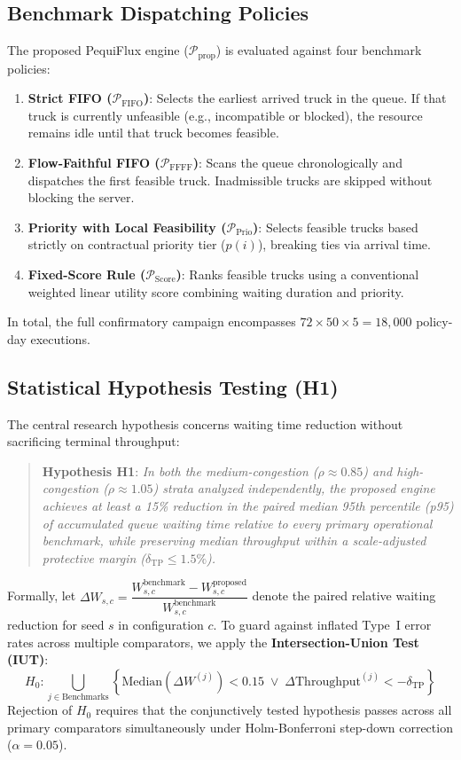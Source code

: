 \documentclass[12pt,a4paper]{article}
\begin{document}
\subsection{Benchmark Dispatching Policies}
The proposed PequiFlux engine ($\mathcal{P}_{\text{prop}}$) is evaluated against four benchmark policies:
\begin{enumerate}[leftmargin=1.2cm,itemsep=0pt,topsep=2pt]
  \item \textbf{Strict FIFO ($\mathcal{P}_{\text{FIFO}}$)}: Selects the earliest arrived truck in the queue. If that truck is currently unfeasible (e.g., incompatible or blocked), the resource remains idle until that truck becomes feasible.
  \item \textbf{Flow-Faithful FIFO ($\mathcal{P}_{\text{FFFF}}$)}: Scans the queue chronologically and dispatches the first feasible truck. Inadmissible trucks are skipped without blocking the server.
  \item \textbf{Priority with Local Feasibility ($\mathcal{P}_{\text{Prio}}$)}: Selects feasible trucks based strictly on contractual priority tier ($p(i)$), breaking ties via arrival time.
  \item \textbf{Fixed-Score Rule ($\mathcal{P}_{\text{Score}}$)}: Ranks feasible trucks using a conventional weighted linear utility score combining waiting duration and priority.
\end{enumerate}

In total, the full confirmatory campaign encompasses $72 \times 50 \times 5 = 18{,}000$ policy-day executions.

\subsection{Statistical Hypothesis Testing (H1)}
The central research hypothesis concerns waiting time reduction without sacrificing terminal throughput:
\begin{quote}
\textbf{Hypothesis H1}: \emph{In both the medium-congestion ($\rho \approx 0.85$) and high-congestion ($\rho \approx 1.05$) strata analyzed independently, the proposed engine achieves at least a 15\% reduction in the paired median 95th percentile (p95) of accumulated queue waiting time relative to every primary operational benchmark, while preserving median throughput within a scale-adjusted protective margin ($\delta_{\mathrm{TP}} \le 1.5\%$).}
\end{quote}

Formally, let $\Delta W_{s,c} = \dfrac{W^{\text{benchmark}}_{s,c} - W^{\text{proposed}}_{s,c}}{W^{\text{benchmark}}_{s,c}}$ denote the paired relative waiting reduction for seed $s$ in configuration $c$. To guard against inflated Type~I error rates across multiple comparators, we apply the \textbf{Intersection-Union Test (IUT)}:
\begin{equation}
  H_0: \bigcup_{j \in \text{Benchmarks}} \left\{ \mathrm{Median}(\Delta W^{(j)}) < 0.15 \;\lor\; \Delta \mathrm{Throughput}^{(j)} < -\delta_{\mathrm{TP}} \right\}
\end{equation}
Rejection of $H_0$ requires that the conjunctively tested hypothesis passes across all primary comparators simultaneously under Holm-Bonferroni step-down correction ($\alpha = 0.05$).
\end{document}
